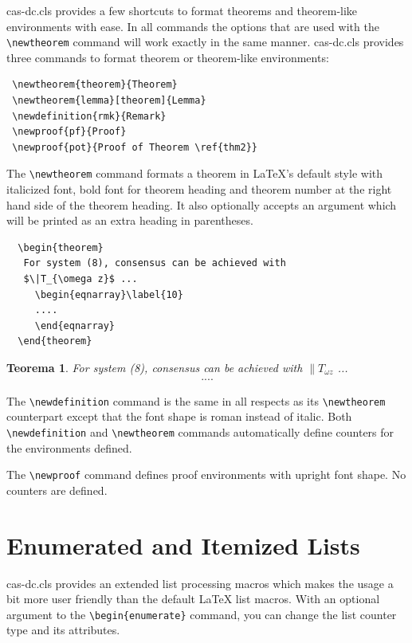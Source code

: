 \documentclass[a4paper,fleqn]{cas-dc}
\newtheorem{theorem}{Teorema}
\begin{document}
{cas-dc.cls} provides a few shortcuts to format theorems and
theorem-like environments with ease. In all commands the options that
are used with the \verb+\newtheorem+ command will work exactly in the same
manner. {cas-dc.cls} provides three commands to format theorem or
theorem-like environments:

\begin{verbatim}
 \newtheorem{theorem}{Theorem}
 \newtheorem{lemma}[theorem]{Lemma}
 \newdefinition{rmk}{Remark}
 \newproof{pf}{Proof}
 \newproof{pot}{Proof of Theorem \ref{thm2}}
\end{verbatim}


The \verb+\newtheorem+ command formats a
theorem in \LaTeX's default style with italicized font, bold font
for theorem heading and theorem number at the right hand side of the
theorem heading.  It also optionally accepts an argument which
will be printed as an extra heading in parentheses. 

\begin{verbatim}
  \begin{theorem}
   For system (8), consensus can be achieved with 
   $\|T_{\omega z}$ ...
     \begin{eqnarray}\label{10}
     ....
     \end{eqnarray}
  \end{theorem}
\end{verbatim}

\begin{theorem}
For system (8), consensus can be achieved with 
$\|T_{\omega z}$ ...
\begin{eqnarray}\label{10}
....
\end{eqnarray}
\end{theorem}

The \verb+\newdefinition+ command is the same in
all respects as its \verb+\newtheorem+ counterpart except that
the font shape is roman instead of italic.  Both
\verb+\newdefinition+ and \verb+\newtheorem+ commands
automatically define counters for the environments defined.

The \verb+\newproof+ command defines proof environments with
upright font shape.  No counters are defined. 


\section[Enumerated ...]{Enumerated and Itemized Lists}
{cas-dc.cls} provides an extended list processing macros
which makes the usage a bit more user friendly than the default
\LaTeX{} list macros.   With an optional argument to the
\verb+\begin{enumerate}+ command, you can change the list counter
type and its attributes.
\end{document}
